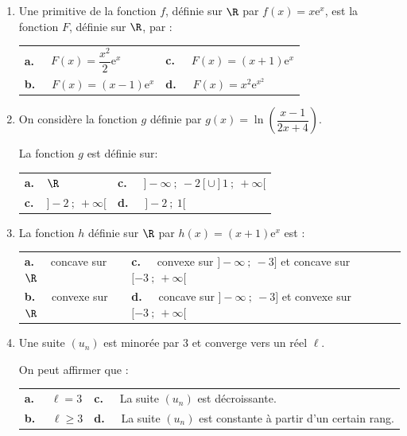 \begin{enumerate}
\item Une primitive de la fonction $f$, définie sur $\R$ par $f(x) =x\text{e}^x$, est la fonction $F$, définie sur $\R$, par :
\begin{center}
\begin{tabularx}{\linewidth}{*{2}X}
\textbf{a.~~} $F(x) =\dfrac{x^2}{2}\text{e}^x$&\textbf{c.~~} $F(x) = (x + 1)\text{e}^x$\\
\textbf{b.~~} $F(x) = (x - 1)\text{e}^x$ &\textbf{d.~~} $F(x) =x^2 \text{e}^{x^2}$ 
\end{tabularx}
\end{center}

\item On considère la fonction $g$ définie par $g(x) = \ln \left(\dfrac{x - 1}{2x+ 4}\right).$

La fonction $g$ est définie sur:

\begin{center}
\begin{tabularx}{\linewidth}{*{2}X}
\textbf{a.~~}$\R$				& \textbf{c.~~} $]-\infty~;~-2[ \cup ]1~;~+\infty[$\\
\textbf{c.~~}$]-2~;~ +\infty[$ 	&\textbf{d.~~} $]-2~;~1[$
\end{tabularx}
\end{center}

\item  La fonction $h$ définie sur $\R$ par $h(x)= (x + 1)\text{e}^{x}$ est :

\begin{center}
\begin{tabularx}{\linewidth}{*{2}X}
\textbf{a.~~} concave sur $\R$& \textbf{c.~~} convexe sur $] -\infty~;~-3]$ et concave sur $[-3~;~+\infty[$\\
\textbf{b.~~} convexe sur $\R$& \textbf{d.~~} concave sur $]-\infty~;~-3]$ et convexe sur $[-3~;~+\infty[$
\end{tabularx}
\end{center}
\item Une suite $\left(u_n\right)$ est minorée par 3 et converge vers un réel $\ell$.

On peut affirmer que :
\begin{center}
\begin{tabularx}{\linewidth}{*{2}X}
\textbf{a.~~} $\ell = 3$ 		&\textbf{c.~~} La suite $\left(u_n\right)$ est décroissante.\\
\textbf{b.~~} $\ell \geqslant 3$ &\textbf{d.~~} La suite $\left(u_n\right)$ est constante à partir d'un certain rang.
\end{tabularx}
\end{center}


\end{enumerate}
